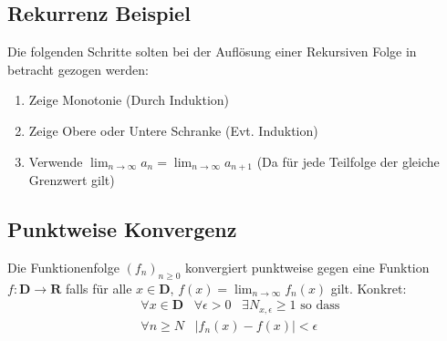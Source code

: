 \documentclass[8pt]{article}
\begin{document}
\begin{multicols*}{3}
  \subsection {Rekurrenz Beispiel}
Die folgenden Schritte solten bei der Auflösung einer Rekursiven Folge in betracht gezogen werden:
\begin{enumerate}
  \item Zeige Monotonie (Durch Induktion)
  \item Zeige Obere oder Untere Schranke (Evt. Induktion)
  \item Verwende $\lim_{n \rightarrow \infty} a_n = \lim_{n \rightarrow \infty} a_{n + 1}$ (Da für jede Teilfolge der gleiche Grenzwert gilt)
\end{enumerate}
 \subsection{Punktweise Konvergenz}
Die Funktionenfolge $(f_n)_{n \geq 0}$ konvergiert punktweise gegen eine Funktion
$f:\mathbf{D} \rightarrow \mathbf{R}$ falls für alle $x \in \mathbf{D}$, $f(x) = \lim_{n \rightarrow \infty} f_n(x)$ gilt. Konkret:
\begin{align*}
  &\forall x \in \mathbf{D} \;\;\; \forall \epsilon > 0 \;\;\; \exists N_{x, \epsilon} \geq 1 \text{ so dass }\\
  &\forall n \geq N \;\;\; |f_n(x) - f(x)| < \epsilon
\end{align*}

\end{multicols*}
\end{document}
